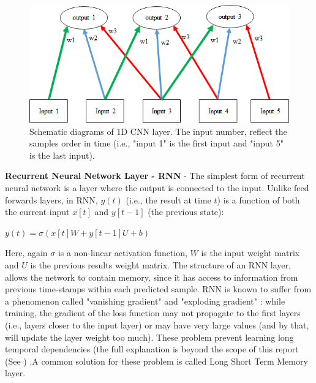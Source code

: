 \documentclass[
12pt, %
english, %
doublespacing, %
headsepline, %
]{MastersDoctoralThesis} %
\begin{document}
\begin{figure}[t]
			\centering
			\includegraphics{CNN_Example_v2.png}
			\caption[Schematic diagrams of 1D CNN layer. The input number, reflect the samples order in time (i.e., "input 1" is the first input and "input 5" is the last input).]{Schematic diagrams of 1D CNN layer. The input number, reflect the samples order in time (i.e., "input 1" is the first input and "input 5" is the last input).}
			\label{fig:CNN_Example}
\end{figure}

\textbf{Recurrent Neural Network Layer - RNN} - The simplest form of recurrent neural network \cite{rumelhart1985learning, werbos1988generalization} is a layer where the output is connected to the input. Unlike feed forwards layers, in RNN, $y(t)$ (i.e., the result at time $t$) is a function of both the current input $x[t]$ and $y[t-1]$ (the previous state): 

	$y\left( t \right) = \sigma \left( {x\left[t \right]W + y\left[ {t - 1} \right]U + b} \right)$

Here, again $\sigma $ is a non-linear activation function, $W$ is the input weight matrix and $U$ is the previous results weight matrix. The structure of an RNN layer, allows the network to contain memory, since it has access to information from previous time-stamps within each predicted sample. RNN is known to suffer from a  phenomenon called "vanishing gradient" and "exploding gradient" \cite{pascanu2013difficulty}: while training, the gradient of the loss function may not propagate to the first layers (i.e., layers closer to the input layer) or may have very large values (and by that, will update the layer weight too much). These problem prevent learning long temporal dependencies (the full explanation is beyond the scope of this report (See \cite{bengio1994learning}) .A common solution for these problem is called Long Short Term Memory layer.
\end{document}
